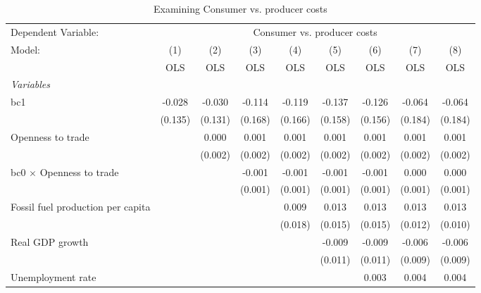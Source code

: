 
\begin{table}[htbp]
   \caption{Examining Consumer vs. producer costs}
   \centering
   \begin{tabular}{lcccccccc}
      \toprule
      Dependent Variable: & \multicolumn{8}{c}{Consumer vs. producer costs}\\
      Model:                                  & (1)     & (2)     & (3)     & (4)     & (5)     & (6)     & (7)     & (8)\\  
                                              &  OLS    & OLS     & OLS     & OLS     & OLS     & OLS     & OLS     & OLS\\  
      \midrule
      \emph{Variables}\\
      bc1                                     & -0.028  & -0.030  & -0.114  & -0.119  & -0.137  & -0.126  & -0.064  & -0.064\\   
                                              & (0.135) & (0.131) & (0.168) & (0.166) & (0.158) & (0.156) & (0.184) & (0.184)\\   
      Openness to trade                       &         & 0.000   & 0.001   & 0.001   & 0.001   & 0.001   & 0.001   & 0.001\\   
                                              &         & (0.002) & (0.002) & (0.002) & (0.002) & (0.002) & (0.002) & (0.002)\\   
      bc0 $\times$ Openness to trade          &         &         & -0.001  & -0.001  & -0.001  & -0.001  & 0.000   & 0.000\\   
                                              &         &         & (0.001) & (0.001) & (0.001) & (0.001) & (0.001) & (0.001)\\   
      Fossil fuel production per capita       &         &         &         & 0.009   & 0.013   & 0.013   & 0.013   & 0.013\\   
                                              &         &         &         & (0.018) & (0.015) & (0.015) & (0.012) & (0.010)\\   
      Real GDP growth                         &         &         &         &         & -0.009  & -0.009  & -0.006  & -0.006\\   
                                              &         &         &         &         & (0.011) & (0.011) & (0.009) & (0.009)\\   
      Unemployment rate                       &         &         &         &         &         & 0.003   & 0.004   & 0.004\\   

\end{tabular}
\end{table}
